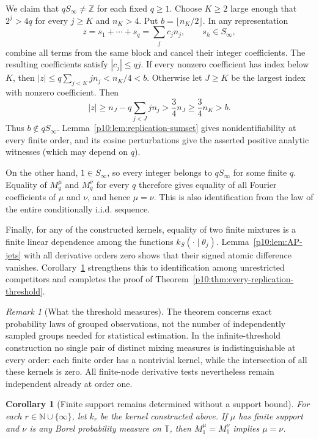 \documentclass[11pt,letterpaper]{article}
\newtheorem{corollary}[theorem]{Corollary}
\theoremstyle{definition}
\theoremstyle{remark}
\newtheorem{remark}[theorem]{Remark}
\newcommand{\1}{\mathbf 1}
\begin{document}
We claim that $qS_\infty\ne\mathbb Z$ for each fixed $q\ge1$.
Choose $K\ge2$ large enough that $2^j>4q$ for every $j\ge K$ and
$n_K>4$.  Put $b=\lfloor n_K/2\rfloor$.  In any representation
\[
 z=s_1+\cdots+s_q=\sum_j c_j n_j,
 \qquad s_h\in S_\infty,
\]
combine all terms from the same block and cancel their integer
coefficients.  The resulting coefficients satisfy $|c_j|\le qj$.
If every nonzero
coefficient has index below $K$, then
$|z|\le q\sum_{j<K}j n_j<n_K/4<b$.
Otherwise let $J\ge K$ be the largest index with nonzero coefficient.
Then
\[
 |z|\ge n_J-q\sum_{j<J}j n_j>\frac34n_J
 \ge\frac34n_K>b.
\]
Thus $b\notin qS_\infty$.  Lemma~\ref{p10:lem:replication-sumset} gives
nonidentifiability at every finite order, and its cosine perturbations
give the asserted positive analytic witnesses (which may depend on $q$).

On the other hand, $1\in S_\infty$, so every integer belongs to
$qS_\infty$ for some finite $q$.  Equality of $M_q^\mu$ and $M_q^\nu$
for every $q$ therefore gives equality of all Fourier coefficients of
$\mu$ and $\nu$, and hence $\mu=\nu$.
This is also identification from the law of the entire conditionally
i.i.d. sequence.

Finally, for any of the constructed kernels, equality of two finite
mixtures is a finite linear dependence among the functions
$k_S(\cdot\mid\theta_j)$.  Lemma~\ref{p10:lem:AP-jets} with all derivative
orders zero shows that their signed atomic difference vanishes.
Corollary~\ref{p10:cor:finite-atomic-all-competitors} strengthens this to
identification among unrestricted competitors and completes the proof
of Theorem~\ref{p10:thm:every-replication-threshold}.

\begin{remark}[What the threshold measures]
The theorem concerns exact probability laws of grouped observations,
not the number of independently sampled groups needed for statistical
estimation.  In the infinite-threshold construction no single pair of
distinct mixing measures is indistinguishable at every order: each
finite order has a nontrivial kernel, while the intersection of all
these kernels is zero.  All finite-node derivative tests nevertheless
remain independent already at order one.
\end{remark}

\begin{corollary}[Finite support remains determined without a support bound]
\label{p10:cor:finite-atomic-all-competitors}
For each $r\in\mathbb N\cup\{\infty\}$, let $k_r$ be the kernel
constructed above.  If $\mu$
has finite support and $\nu$ is any Borel probability measure on
$\mathbb T$, then $M_1^\mu=M_1^\nu$ implies $\mu=\nu$.
\end{corollary}
\end{document}
